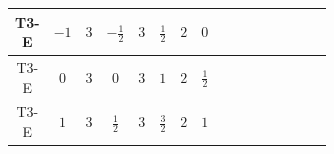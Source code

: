 \documentclass[8pt]{article}
\begin{document}
\begin{landscape}
\begin{longtable}{@{}cccccccc >{\raggedright\arraybackslash}p{0.21\linewidth} >{\raggedright\arraybackslash}p{0.21\linewidth} >{\raggedright\arraybackslash}p{0.21\linewidth}@{}}
\midrule
T3-E & $-1$ & $3$ & $-\frac{1}{2}$ & $3$ & $\frac{1}{2}$ & $2$ & $0$ & \scriptsize\adjustbox{max width=\linewidth}{$\begin{gathered} +D_{\mu _1}\left(S_{2,j_1}\right){}^{\dagger } D_{\mu _1}\left(S_{2,j_1}\right)\end{gathered}$} & \scriptsize\adjustbox{max width=\linewidth}{$\begin{gathered} -\overline{F_{j_1,r_1}}\, F_{j_1,r_1} M_F\end{gathered}$} & \scriptsize\adjustbox{max width=\linewidth}{$\begin{gathered} +i \overline{F_{j_1,r_1}}\, \gamma ^{\mu _1}\, D_{\mu _1}\left(F_{j_1,r_1}\right)\end{gathered}$} \\
\midrule
T3-E & $0$ & $3$ & $0$ & $3$ & $1$ & $2$ & $\frac{1}{2}$ & \scriptsize\adjustbox{max width=\linewidth}{$\begin{gathered} +D_{\mu _1}\left(S_{2,j_1}\right){}^{\dagger } D_{\mu _1}\left(S_{2,j_1}\right)\end{gathered}$} & \scriptsize\adjustbox{max width=\linewidth}{$\begin{gathered} -\overline{F_{j_1,r_1}}\, F_{j_1,r_1} M_F\end{gathered}$} & \scriptsize\adjustbox{max width=\linewidth}{$\begin{gathered} +i \overline{F_{j_1,r_1}}\, \gamma ^{\mu _1}\, D_{\mu _1}\left(F_{j_1,r_1}\right)\end{gathered}$} \\
\midrule
T3-E & $1$ & $3$ & $\frac{1}{2}$ & $3$ & $\frac{3}{2}$ & $2$ & $1$ & \scriptsize\adjustbox{max width=\linewidth}{$\begin{gathered} +D_{\mu _1}\left(S_{2,j_1}\right){}^{\dagger } D_{\mu _1}\left(S_{2,j_1}\right)\end{gathered}$} & \scriptsize\adjustbox{max width=\linewidth}{$\begin{gathered} -\overline{F_{j_1,r_1}}\, F_{j_1,r_1} M_F\end{gathered}$} & \scriptsize\adjustbox{max width=\linewidth}{$\begin{gathered} +i \overline{F_{j_1,r_1}}\, \gamma ^{\mu _1}\, D_{\mu _1}\left(F_{j_1,r_1}\right)\end{gathered}$} \\
\midrule

\end{longtable}
\end{landscape}
\end{document}
